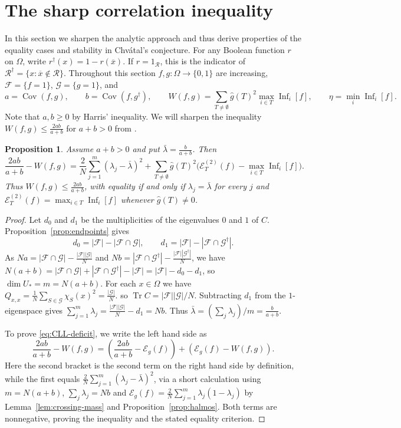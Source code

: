 \documentclass{article}
\theoremstyle{plain}
\newtheorem{prop}[theo]{Proposition}
\theoremstyle{definition}
\newcommand{\mc}[1]{\mathcal{#1}}
\newcommand{\ov}{\overline}
\newcommand{\es}{\emptyset}
\newcommand{\cE}{\mathcal E}
\newcommand{\OO}{\Omega}
\newcommand{\on}{\operatorname}
\begin{document}
\section{The sharp correlation inequality}\label{sec:sharp-correlation}

In this section we sharpen the analytic approach and thus derive properties
of the equality cases and stability in Chv\'atal's conjecture.
For any Boolean function $r$ on $\OO$, write $r^\dagger(x)=1-r(\ov x)$.  
If $r=1_{\mc R}$, this is the indicator of $\mc R^\dagger=\{x:\ov x\notin\mc R\}$.  
Throughout this section $f,g:\OO\to\{0,1\}$ are increasing, $\mc F=\{f=1\}$, $\mc G=\{g=1\}$, and 
\[
 a=\on{Cov}(f,g),\qquad b=\on{Cov}(f,g^\dagger),\qquad
 W(f,g)=\sum_{T\ne\es}\widehat g(T)^2\max_{i\in T}\on{Inf}_i[f],\qquad
 \eta=\min_i\on{Inf}_i[f].
\]
Note that $a,b\ge0$ by Harris' inequality.
We will sharpen the inequality $W(f,g)\le \frac{2ab}{a+b}$ for $a+b>0$ from \cite{CLL}.

\begin{prop}\label{prop:angles}
Assume $a+b>0$ and put $\bar\lambda=\tfrac{b}{a+b}$. Then
\begin{equation}\label{eq:CLL-deficit}
 \frac{2ab}{a+b}-W(f,g)
 =\frac2N\sum_{j=1}^m(\lambda_j-\bar\lambda)^2
 +\sum_{T\ne\es}\widehat g(T)^2\bigl(\cE_T^{(2)}(f)-\max_{i\in T}\on{Inf}_i[f]\bigr).
\end{equation}
Thus $W(f,g)\le \frac{2ab}{a+b}$, with equality if and only if $\lambda_j=\bar\lambda$ for every $j$ 
and $\cE_T^{(2)}(f)=\max_{i\in T}\on{Inf}_i[f]$ whenever $\widehat g(T)\ne0$.
\end{prop}

\begin{proof}
Let $d_0$ and $d_1$ be the multiplicities of the eigenvalues $0$ and $1$ of $C$.  Proposition~\ref{prop:endpoints} gives
\[
 d_0=|\mc F|-|\mc F\cap\mc G|,
 \qquad
 d_1=|\mc F|-|\mc F\cap\mc G^\dagger|.
\]
As $Na=|\mc F\cap\mc G|-\frac{|\mc F||\mc G|}{N}$
and $Nb=|\mc F\cap\mc G^\dagger|-\frac{|\mc F||\mc G^\dagger|}{N}$,
we have $N(a+b)=|\mc F\cap\mc G|+|\mc F\cap\mc G^\dagger|-|\mc F| = |\mc F|-d_0-d_1$,
so $\dim U_*=m=N(a+b)$. For each $x \in \OO$ we have
\(
 Q_{x,x}=\frac1N\sum_{S\in\mc G}\chi_S(x)^2=\frac{|\mc G|}{N}.
\)
so $\on{Tr}C=|\mc F||\mc G|/N$. Subtracting $d_1$ from the $1$-eigenspace gives
\(
 \sum_{j=1}^m\lambda_j
 =\frac{|\mc F||\mc G|}{N}-d_1
 =N b.
\)
Thus $\bar\lambda=(\sum_j\lambda_j)/m=\tfrac{b}{a+b}$.

To prove \eqref{eq:CLL-deficit}, we write the left hand side as
\[
 \frac{2ab}{a+b}-W(f,g)
 =\left(\frac{2ab}{a+b}-\mc E_g(f)\right)
  +\left(\mc E_g(f)-W(f,g)\right).
\]
Here the second bracket is the second term on the right hand side by definition,
while the first equals $\frac2N\sum_{j=1}^m(\lambda_j-\bar\lambda)^2$,
via a short calculation using $m=N(a+b)$, $\sum_j\lambda_j=Nb$ and
$ \mc E_g(f)=\frac2N\sum_{j=1}^m\lambda_j(1-\lambda_j)$ by Lemma~\ref{lem:crossing-mass}
and Proposition~\ref{prop:halmos}. Both terms are nonnegative, proving the inequality and the stated equality criterion.
\end{proof}
\end{document}

